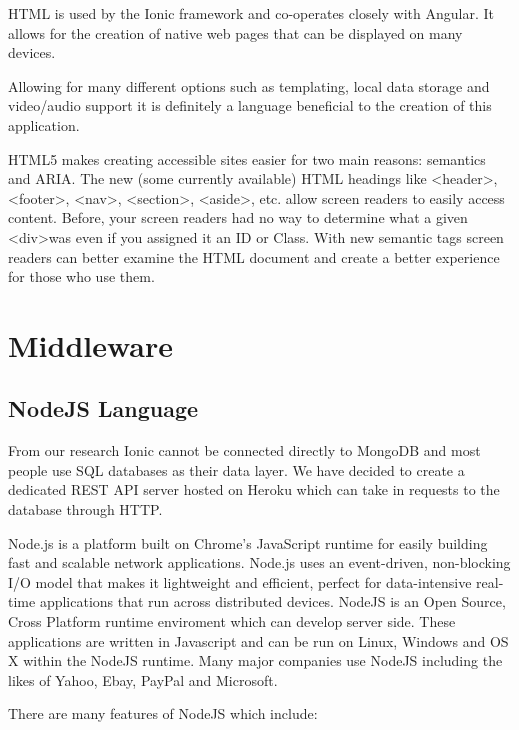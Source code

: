 HTML is used by the Ionic framework and co-operates closely with Angular. It allows for the creation of native web pages that can be displayed on many devices.

Allowing for many different options such as templating, local data storage and video/audio support it is definitely a language beneficial to the creation of this application.

HTML5 makes creating accessible sites easier for two main reasons: semantics and ARIA. The new (some currently available) HTML headings like  \textless header\textgreater, \textless footer\textgreater, \textless nav\textgreater, \textless section\textgreater, \textless aside\textgreater, etc. allow screen readers to easily access content.\cite{html} Before, your screen readers had no way to determine what a given \textless div\textgreater  was even if you assigned it an ID or Class.\cite{html} With new semantic tags screen readers can better examine the HTML document and create a better experience for those who use them.\cite{html}



\section{Middleware}
\subsection{NodeJS Language}
From our research Ionic cannot be connected directly to MongoDB and most people use SQL databases as their data layer. We have decided to create a dedicated REST API server hosted on Heroku which can take in requests to the database through HTTP.

Node.js is a platform built on Chrome's JavaScript runtime for easily building fast and scalable network applications.\cite{node} Node.js uses an event-driven, non-blocking I/O model that makes it lightweight and efficient, perfect for data-intensive real-time applications that run across distributed devices. \cite{node} NodeJS is an Open Source, Cross Platform runtime enviroment which can develop server side. These applications are written in Javascript and can be run on Linux, Windows and OS X within the NodeJS runtime. Many major companies use NodeJS including the likes of Yahoo, Ebay, PayPal and Microsoft.

There are many features of NodeJS which include:


